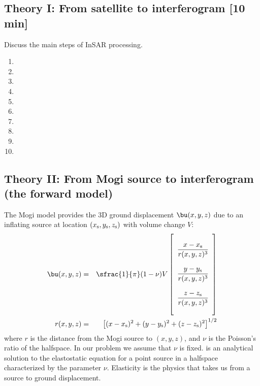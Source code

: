 \documentclass[11pt,titlepage,fleqn]{article}
\begin{document}

\subsection*{Theory I: From satellite to interferogram [10 min]}

Discuss the main steps of InSAR processing.
%
\begin{spacing}{2}
\begin{enumerate}
\item 
\item 
\item 
\item 
\item 
\item 
\item 
\item 
\item
\item
\end{enumerate}
\end{spacing}


\pagebreak
\subsection*{Theory II: From Mogi source to interferogram (the forward model)}

The Mogi model provides the 3D ground displacement $\bu(x,y,z)$ due to an inflating source at location $(x_{\rm s},y_{\rm s},z_{\rm s})$ with volume change $V$:
%
\begin{eqnarray}
\bu(x,y,z) &=& \sfrac{1}{\pi}(1 - \nu)V
\left[
\begin{array}{c} \\
\displaystyle{\frac{x-x_{\rm s}}{r(x,y,z)^3}} \\ \\
\displaystyle{\frac{y-y_{\rm s}}{r(x,y,z)^3}} \\ \\
\displaystyle{\frac{z-z_{\rm s}}{r(x,y,z)^3}} \\ \\
\end{array}
\right]
\label{forward}
\\
r(x,y,z) &=& \left[ (x-x_{\rm s})^2 + (y-y_{\rm s})^2 + (z-z_{\rm s})^2  \right]^{1/2}
\end{eqnarray}
%
where $r$ is the distance from the Mogi source to $(x,y,z)$, and $\nu$ is the Poisson's ratio of the halfspace. In our problem we assume that $\nu$ is fixed.  is an analytical solution to the elastostatic equation for a point source in a halfspace characterized by the parameter $\nu$. Elasticity is the physics that takes us from a source to ground displacement.
\end{document}
